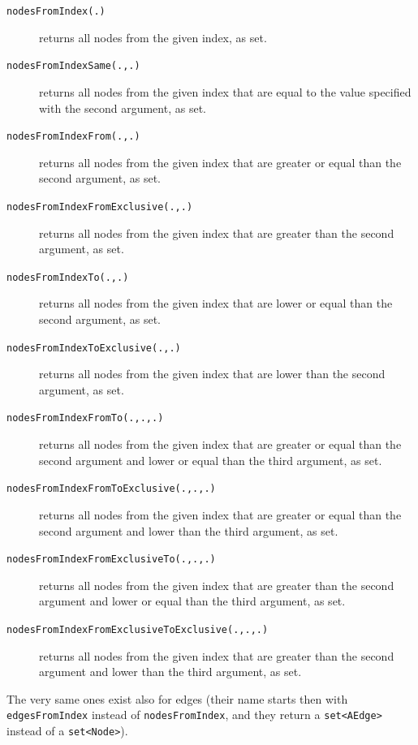 \begin{description}
\item[\texttt{nodesFromIndex(.)}] returns all nodes from the given index, as set.
\item[\texttt{nodesFromIndexSame(.,.)}] returns all nodes from the given index that are equal to the value specified with the second argument, as set.
\item[\texttt{nodesFromIndexFrom(.,.)}] returns all nodes from the given index that are greater or equal than the second argument, as set.
\item[\texttt{nodesFromIndexFromExclusive(.,.)}] returns all nodes from the given index that are greater than the second argument, as set.
\item[\texttt{nodesFromIndexTo(.,.)}] returns all nodes from the given index that are lower or equal than the second argument, as set.
\item[\texttt{nodesFromIndexToExclusive(.,.)}] returns all nodes from the given index that are lower than the second argument, as set.
\item[\texttt{nodesFromIndexFromTo(.,.,.)}] returns all nodes from the given index that are greater or equal than the second argument and lower or equal than the third argument, as set.
\item[\texttt{nodesFromIndexFromToExclusive(.,.,.)}] returns all nodes from the given index that are greater or equal than the second argument and lower than the third argument, as set.
\item[\texttt{nodesFromIndexFromExclusiveTo(.,.,.)}] returns all nodes from the given index that are greater than the second argument and lower or equal than the third argument, as set.
\item[\texttt{nodesFromIndexFromExclusiveToExclusive(.,.,.)}] returns all nodes from the given index that are greater than the second argument and lower than the third argument, as set.
\end{description}

The very same ones exist also for edges (their name starts then with \texttt{edgesFromIndex} instead of \texttt{nodesFromIndex}, and they return a \texttt{set<AEdge>} instead of a \texttt{set<Node>}).


